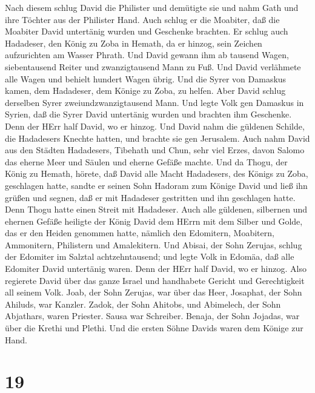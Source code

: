  Nach diesem schlug David die Philister und demütigte sie
und nahm Gath und ihre Töchter aus der Philister Hand.  Auch
schlug er die Moabiter, daß die Moabiter David untertänig wurden und
Geschenke brachten.  Er schlug auch Hadadeser, den König zu
Zoba in Hemath, da er hinzog, sein Zeichen aufzurichten am Wasser
Phrath.  Und David gewann ihm ab tausend Wagen,
siebentausend Reiter und zwanzigtausend Mann zu Fuß. Und David
verlähmete alle Wagen und behielt hundert Wagen übrig.  Und
die Syrer von Damaskus kamen, dem Hadadeser, dem Könige zu Zoba, zu
helfen. Aber David schlug derselben Syrer zweiundzwanzigtausend Mann.
 Und legte Volk gen Damaskus in Syrien, daß die Syrer David
untertänig wurden und brachten ihm Geschenke. Denn der HErr half David,
wo er hinzog.  Und David nahm die güldenen Schilde, die
Hadadesers Knechte hatten, und brachte sie gen Jerusalem. 
Auch nahm David aus den Städten Hadadesers, Tibehath und Chun, sehr viel
Erzes, davon Salomo das eherne Meer und Säulen und eherne Gefäße machte.
 Und da Thogu, der König zu Hemath, hörete, daß David alle
Macht Hadadesers, des Königs zu Zoba, geschlagen hatte, 
sandte er seinen Sohn Hadoram zum Könige David und ließ ihn grüßen und
segnen, daß er mit Hadadeser gestritten und ihn geschlagen hatte. Denn
Thogu hatte einen Streit mit Hadadeser. Auch alle güldenen, silbernen
und ehernen Gefäße  heiligte der König David dem HErrn mit
dem Silber und Golde, das er den Heiden genommen hatte, nämlich den
Edomitern, Moabitern, Ammonitern, Philistern und Amalekitern.
 Und Abisai, der Sohn Zerujas, schlug der Edomiter im
Salztal achtzehntausend;  und legte Volk in Edomäa, daß
alle Edomiter David untertänig waren. Denn der HErr half David, wo er
hinzog.  Also regierete David über das ganze Israel und
handhabete Gericht und Gerechtigkeit all seinem Volk. 
Joab, der Sohn Zerujas, war über das Heer, Josaphat, der Sohn Ahiluds,
war Kanzler.  Zadok, der Sohn Ahitobs, und Abimelech, der
Sohn Abjathars, waren Priester. Sausa war Schreiber. 
Benaja, der Sohn Jojadas, war über die Krethi und Plethi. Und die ersten
Söhne Davids waren dem Könige zur Hand.

\hypertarget{section-18}{%
\section{19}\label{section-18}}

